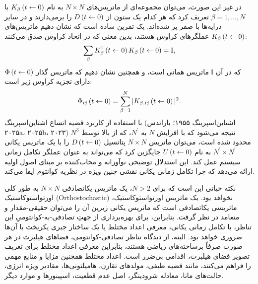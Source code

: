 \documentclass{article}
\providecommand{\idmatrix}{\mathbb{I}}
\newcommand{\stochasticmatrix}{\Phi}
\newcommand{\dynop}{D}
\newcommand{\timeevop}{U}
\begin{document}
در غیر این صورت، می‌توان مجموعه‌ای از ماتریس‌های $N\times N$ به نام $K_{\beta}\left(t\leftarrow0\right)$ با $\beta=1,\dots,N$ تعریف کرد که هر کدام یک ستون از $\dynop\left(t\from0\right)$ را برمی‌دارند و در سایر درایه‌ها با صفر پر شده‌اند. یک تمرین ساده است که نشان دهیم ماتریس‌های $K_{\beta}\left(t\leftarrow0\right)$ عملگرهای کراوس  هستند، بدین معنی که در اتحاد کراوس صدق می‌کنند:
\begin{equation}
\sum_{\beta}\krausmatrix_{\beta}^{\adj}\left(t\from0\right)\krausmatrix_{\beta}\left(t\from0\right)=\idmatrix,\label{eq:KrausIdentity}
\end{equation}
که در آن $\idmatrix$ ماتریس همانی است، و همچنین نشان دهیم که ماتریس گذار $\stochasticmatrix\left(t\from0\right)$ دارای تجزیه کراوس زیر است:
\begin{equation}
\stochasticmatrix_{ij}\left(t\from0\right)=\sum_{\beta=1}^{N}\verts{\krausmatrix_{\beta,ij}\left(t\from0\right)}^{2}.\label{eq:TransitionMatrixFromKrausDecomposition}
\end{equation}
با استفاده از کاربرد قضیه اتساع اشتاین‌اسپرینگ (اشتاین‌اسپرینگ ۱۹۵۵؛ باراندس ۲۰۲۵a، ۲۰۲۵b، ۲۰۲۳)\nocite{Stinespring:1955pfoc,Barandes:2025tsqc,Barandes:2025qsaisp,Barandes:2023tsqt} نتیجه می‌شود که با افزایش $N$ به $N^{\prime}$، که از بالا توسط $N^{3}$ محدود شده است، می‌توان ماتریس $N\times N$ پتانسیل $\dynop\left(t\from0\right)$ را با یک ماتریس یکانی $N^{\prime}\times N^{\prime}$ به نام $\timeevop\left(t\from0\right)$ جایگزین کرد که می‌تواند به عنوان عملگر تکامل زمانی سیستم عمل کند. این استدلال توضیحی نوآورانه و مجاب‌کننده بر مبنای اصول اولیه ارائه می‌دهد که چرا تکامل زمانی یکانی نقشی چنین ویژه در نظریه کوانتوم ایفا می‌کند.

نکته حیاتی این است که برای $N>2$، یک ماتریس یکاتصادفی $N\times N$ به طور کلی اورتواستوکاستیک (Orthostochastic) نخواهد بود. یک ماتریس اورتواستوکاستیک، ماتریسی یکاتصادفی است که ماتریس یکانی زیرین آن را می‌توان حقیقی-مقدار و متعامد در نظر گرفت. بنابراین، برای بهره‌برداری از جهتِ تصادفی-به-کوانتومیِ این تناظر، با تکامل زمانی یکانی، معرفی اعداد مختلط یا یک ساختار جبری یکریخت با آن‌ها ضروری خواهد بود. البته، از دیدگاه تناظر تصادفی-کوانتومی، فضاهای هیلبرت در هر صورت صرفاً برساخته‌های ریاضی  هستند، بنابراین معرفی اعداد مختلط برای تعریف تصویر فضای هیلبرت، اقدامی بی‌ضرر است. اعداد مختلط همچنین مزایا و منابع مهمی را فراهم می‌کنند، مانند قضیه طیفی، مولدهای تقارن، هامیلتونی‌ها، مقادیر ویژه انرژی، حالت‌های مانا، معادله شرودینگر، اصل عدم قطعیت، اسپینورها و موارد دیگر.
\end{document}

